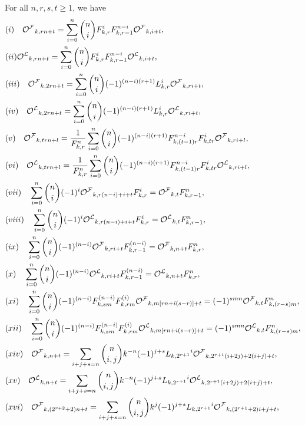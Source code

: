 \begin{theorem}For all $n, r, s, t\geq 1$, we have\label{2.3t}
\begin{align*}
&(i)\quad\hp_{k,rn+t}=\sum\limits_{i=0}^{n}\binom{n}{i} {F}_{k,r}^{i}{F}_{k,r-1}^{n-i}\hp_{k,i+t},\\
&(ii)\hq_{k,rn+t}=\sum\limits_{i=0}^{n}\binom{n}{i} {F}_{k,r}^{i}{F}_{k,r-1}^{n-i}\hq_{k,i+t},\\
&(iii)\quad\hp_{k,2rn+t}=\sum\limits_{i=0}^{n}\binom{n}{i}(-1)^{(n-i)(r+1)}{L}_{k,r}^{i}\hp_{k,ri+t},\\
&(iv)\quad\hq_{k,2rn+t}=\sum\limits_{i=0}^{n}\binom{n}{i}(-1)^{(n-i)(r+1)}{L}_{k,r}^{i}\hq_{k,ri+t},\\
&(v)\quad\hp_{k,trn+l}=\dfrac{1}{{F}_{k,r}^{n}}\sum\limits_{i=0}^{n}\binom{n}{i}(-1)^{(n-i)(r+1)} {F}_{k,(t-1)r}^{n-i}{F}_{k,tr}^{i}\hp_{k,ri+l},\\
&(vi)\quad\hq_{k,trn+l}=\dfrac{1}{{F}_{k,r}^{n}}\sum\limits_{i=0}^{n}\binom{n}{i}(-1)^{(n-i)(r+1)} {F}_{k,(t-1)r}^{n-i}{F}_{k,tr}^{i}\hq_{k,ri+l},\\
&(vii)\quad\sum\limits_{i=0}^{n}\binom{n}{i}(-1)^{i} \hp_{k,r(n-i)+i+t}{F}_{k,r}^{i}=\hp_{k,t}{F}_{k,r-1}^{n},\\
&(viii)\quad\sum\limits_{i=0}^{n}\binom{n}{i}(-1)^{i} \hq_{k,r(n-i)+i+t}{F}_{k,r}^{i}=\hq_{k,t}{F}_{k,r-1}^{n},\\
&(ix)\quad\sum\limits_{i=0}^{n}\binom{n}{i}(-1)^{(n-i)} \hp_{k,ri+t}{F}_{k,r-1}^{(n-i)}=\hp_{k,n+t}{F}_{k,r}^{n} ,\\
&(x)\quad\sum\limits_{i=0}^{n}\binom{n}{i}(-1)^{(n-i)} \hq_{k,ri+t}{F}_{k,r-1}^{(n-i)}=\hq_{k,n+t}{F}_{k,r}^{n} ,\\
&(xi)\quad\sum\limits_{i=0}^{n}\binom{n}{i}(-1)^{(n-i)}{F}_{k,sm}^{(n-i)}{F}_{k,rm}^{(i)} \hp_{k,m[rn+i(s-r)]+t}=(-1)^{smn}\hp_{k,t}{F}_{k,(r-s)m}^{n},\\
&(xii)\quad\sum\limits_{i=0}^{n}\binom{n}{i}(-1)^{(n-i)}{F}_{k,sm}^{(n-i)}{F}_{k,rm}^{(i)} \hq_{k,m[rn+i(s-r)]+t}=(-1)^{smn}\hq_{k,t}{F}_{k,(r-s)m}^{n},\\
&(xiv)\quad\hp_{k,n+t}=\sum\limits_{i+j+s=n}\binom{n}{i, j} k^{-n}(-1)^{j+s}{{L}_{k,2^{r+1}}}^i\hp_{k,2^{r+1}(i+2j)+2(i+j)+t},\\
&(xv)\quad\hq_{k,n+t}=\sum\limits_{i+j+s=n}\binom{n}{i, j} k^{-n}(-1)^{j+s}{{L}_{k,2^{r+1}}}^i\hq_{k,2^{r+1}(i+2j)+2(i+j)+t},\\
&(xvi)\quad\hp_{k,(2^{r+2}+2)n+t}=\sum\limits_{i+j+s=n}\binom{n}{i, j} k^{j}(-1)^{j+s}{{L}_{k,2^{r+1}}}^i\hp_{k,(2^{r+1}+2)i+j+t},\\

\end{align*}
\end{theorem}
